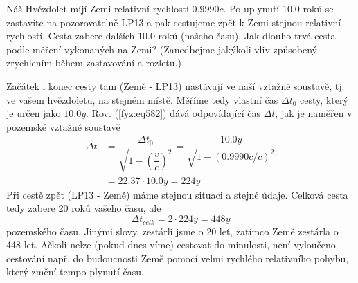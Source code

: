 \begin{mdframed}[style=mdexam]
  \begin{example}\label{fyz:fey_exam021}
    Náš Hvězdolet míjí Zemi relativní rychlostí \(\num{0.999 0}c\). Po uplynutí \num{10.0} roků se
    zastavíte na pozorovatelně LP13 a pak cestujeme zpět k Zemi stejnou relativní rychlostí. Cesta
    zabere dalších \num{10.0} roků (našeho času). Jak dlouho trvá cesta podle měření vykonaných na
    Zemi? (Zanedbejme jakýkoli vliv způsobený zrychlením během zastavování a rozletu.)
    
    \vspace{1em}
    Začátek i konec cesty tam (Země - LP13) nastávají ve naší vztažné soustavě, tj. ve vašem
    hvězdoletu, na stejném místě. Měříme tedy vlastní čas \(\Delta t_0\) cesty, který je určen jako
    \(\num{10.0} y\). Rov. (\ref{fyz:eq582}) dává odpovídající čas \(\Delta t\), jak je naměřen v
    pozemské vztažné soustavě
    \begin{align*}
      \Delta t &= \dfrac{\Delta t_0}{\sqrt{1  - \left(\dfrac{v}{c}\right)^2}}
                = \dfrac{\num{10.0} y}{\sqrt{1  - (\num{0.999 0}c/c)^2}}      \\
               &= \num{22.37}\cdot\num{10.0} y = \num{224} y
    \end{align*}
    Při cestě zpět (LP13 - Země) máme stejnou situaci a stejné údaje. Celková cesta tedy zabere 20
    roků vašeho času, ale
    \begin{equation*}
      \Delta t_{celk}  = 2\cdot\num{224} y = \num{448} y
    \end{equation*}
    pozemského času. Jinými slovy, zestárli jsme o \num{20} let, zatímco Země zestárla o \num{448}
    let. Ačkoli nelze (pokud dnes víme) cestovat do minulosti, není vyloučeno cestování např. do
    budoucnosti Země pomocí velmi rychlého relativního pohybu, který změní tempo plynutí času.
  \end{example}
\end{mdframed}